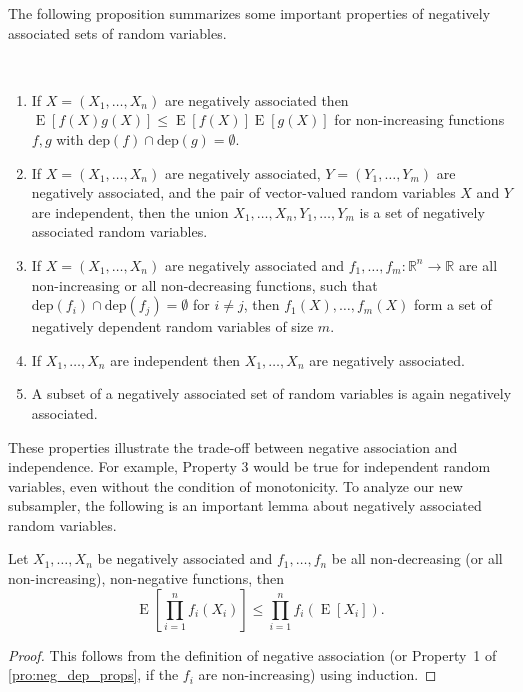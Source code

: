\documentclass[a4paper,UKenglish,cleveref, autoref, thm-restate]{lipics-v2021}
\DeclareMathOperator{\expect}{\mathrm{E}}
\begin{document}
The following proposition summarizes some important properties of negatively associated sets of random variables.
\begin{proposition}\label{pro:neg_dep_props}~
\begin{enumerate}
\item \label{it:neg_dep_props:mult_mono} If $X=(X_1,\ldots,X_n)$ are negatively associated then $\expect [f(X) g(X)] \leq \expect [f(X)] \expect [g(X)]$ for non-increasing functions $f,g$ with $\mathrm{dep}(f) \cap \mathrm{dep}(g) = \emptyset$.
\item If $X=(X_1,\ldots,X_n)$ are negatively associated, $Y=(Y_1,\ldots,Y_m)$ are negatively associated, and the pair of vector-valued random variables $X$ and $Y$ are independent, then the union $X_1,\dots,X_n,Y_1,\dots,Y_m$ is a set of negatively associated random variables.
\item If $X=(X_1,\ldots,X_n)$ are negatively associated and $f_1, \dots ,f_m : \mathbb R^n \rightarrow \mathbb R$ are all non-increasing or all non-decreasing functions, such that $\mathrm{dep}(f_i) \cap \mathrm{dep}(f_j) = \emptyset$ for $i \neq j$, then $f_1(X),\ldots,f_m(X)$ form a set of negatively dependent random variables of size $m$.
\item If $X_1,\dots,X_n$ are independent then $X_1,\dots,X_n$ are negatively associated.
\item A subset of a negatively associated set of random variables is again negatively associated.
\end{enumerate}
\end{proposition}

These properties illustrate the trade-off between negative association and independence.
For example, Property 3 would be true for independent random variables, even without the condition of monotonicity.
To analyze our new subsampler, the following is an important lemma about negatively associated random variables.

\begin{lemma}\label{le:neg_assoc_prod}
Let $X_1,\dots,X_n$ be negatively associated and $f_1,\dots,f_n$ be all non-decreasing (or all non-increasing), non-negative functions, then
\[
  \expect \left[\prod_{i=1}^{n} f_i(X_i)\right] \leq \prod_{i=1}^{n} f_i(\expect [X_i]) \textrm{.}
\]
\end{lemma}
\begin{proof}
This follows from the definition of negative association (or Property~1 of \cref{pro:neg_dep_props}, if the $f_i$ are non-increasing) using induction.
\end{proof}
\end{document}
